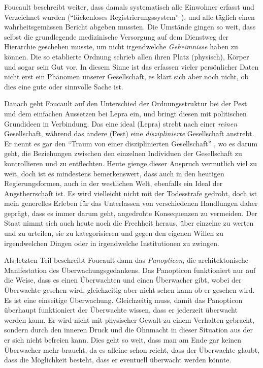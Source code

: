 \documentclass[a4paper,ngerman,11pt]{scrartcl}
\begin{document}
Foucault beschreibt weiter, dass damals systematisch alle Einwohner erfasst
und Verzeichnet wurden ("`lückenloses Registrierungssystem"'
\cite{Foucault1977}), und alle täglich einen wahrheitsgemässen Bericht abgeben
mussten. Die Umstände gingen so weit, dass selbst die grundlegende
medizinische Versorgung auf dem Dienstweg der Hierarchie geschehen musste, um
nicht irgendwelche \emph{Geheimnisse} haben zu können. Die so etablierte Ordnung
schrieb allen ihren Platz (physisch), Körper und sogar sein Gut
vor.\cite{Foucault1977} In diesem Sinne ist das erfassen vieler persönlicher
Daten nicht erst ein Phänomen unserer Gesellschaft, es klärt sich aber noch
nicht, ob dies eine gute oder sinnvolle Sache ist.

Danach geht Foucault auf den Unterschied der Ordnungsstruktur bei der Pest und
dem einfachen Aussetzen bei Lepra ein, und bringt diesen mit politischen
Grundideen in Verbindung. Das eine ideal (Lepra) strebt nach einer \emph{reinen}
Gesellschaft, während das andere (Pest) eine \emph{disziplinierte} Gesellschaft
anstrebt. Er nennt es gar den "`Traum von einer disziplinierten Gesellschaft"'
\cite{Foucault1977}, wo es darum geht, die Beziehungen zwischen den einzelnen
Individuen der Gesellschaft zu kontrollieren und zu entflechten. Heute gienge
dieser Anspruch vermutlich viel zu weit, doch ist es mindestens bemerkenswert,
dass auch in den heutigen Regierungsformen, auch in der westlichen Welt,
ebenfalls ein Ideal der Angstherrschaft ist. Es wird vielleicht nicht mit der
Todesstrafe gedroht, doch ist mein generelles Erleben für das Unterlassen von
verschiedenen Handlungen daher geprägt, dass es immer darum geht, angedrohte
Konsequenzen zu vermeiden. Der Staat nimmt sich auch heute noch die Frechheit
heraus, über einzelne zu werten und zu urteilen, sie zu kategorisieren und
gegen den eigenen Willen zu irgendwelchen Dingen oder in irgendwelche
Institutionen zu zwingen.

Als letzten Teil beschreibt Foucault dann das \emph{Panopticon}, die
architektonische Manifestation des Überwachungsgedankens. Das Panopticon
funktioniert nur auf die Weise, dass es einen Überwachten und einen Überwacher
gibt, wobei der Überwachte gesehen wird, gleichzeitig aber nicht sehen kann ob
er gesehen wird. Es ist eine einseitige Überwachung. Gleichzeitig muss, damit
das Panopticon überhaupt funktioniert der Überwachte wissen, dass er jederzeit
überwacht werden kann. Er wird nicht mit physischer Gewalt zu einem Verhalten
gebracht, sondern durch den inneren Druck und die Ohnmacht in dieser Situation
aus der er sich nicht befreien kann. Dies geht so weit, dass man am Ende gar
keinen Überwacher mehr braucht, da es alleine schon reicht, dass der
Überwachte glaubt, dass die Möglichkeit besteht, dass er eventuell überwacht
werden könnte.
\end{document}
